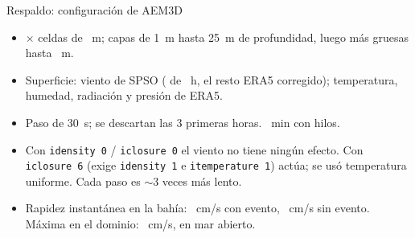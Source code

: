 \documentclass[aspectratio=169,10pt]{beamer}
\begin{document}
\begin{frame}{Respaldo: configuración de AEM3D}
  \small
  \begin{itemize}
    \item \mallaFilas$\times$\mallaColumnas{} celdas de \mallaDx~m; \mallaCapas{} capas de 1~m hasta 25~m de
      profundidad, luego más gruesas hasta \mallaProfMax~m.
    \item Superficie: viento de SPSO (\horasSpso{} de \horasForzamiento~h, el resto ERA5 corregido); temperatura,
      humedad, radiación y presión de ERA5.
    \item Paso de 30~s; se descartan las 3 primeras horas. \aemMinutos~min con \aemHilos{} hilos.
    \item Con \texttt{idensity 0} / \texttt{iclosure 0} el viento no tiene ningún efecto. Con \texttt{iclosure 6}
      (exige \texttt{idensity 1} e \texttt{itemperature 1}) actúa; se usó temperatura uniforme. Cada paso es
      $\sim$3 veces más lento.
    \item Rapidez instantánea en la bahía: \rapEvento~cm/s con evento, \rapCalma~cm/s sin evento. Máxima en el
      dominio: \aemVelMax~cm/s, en mar abierto.
  \end{itemize}
\end{frame}
\end{document}
